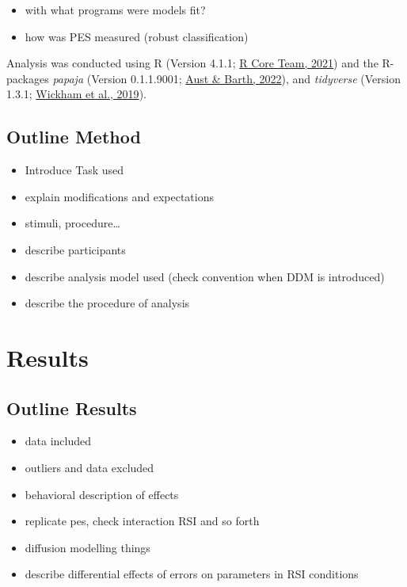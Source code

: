 \documentclass[
  man,floatsintext]{apa7}
\providecommand{\tightlist}{%
  \setlength{\itemsep}{0pt}\setlength{\parskip}{0pt}}
\begin{document}
\begin{itemize}
\tightlist
\item
  with what programs were models fit?
\item
  how was PES measured (robust classification)
\end{itemize}

Analysis was conducted using R (Version 4.1.1; \protect\hyperlink{ref-R-base}{R Core Team, 2021}) and the R-packages \emph{papaja} (Version 0.1.1.9001; \protect\hyperlink{ref-R-papaja}{Aust \& Barth, 2022}), and \emph{tidyverse} (Version 1.3.1; \protect\hyperlink{ref-R-tidyverse}{Wickham et al., 2019}).

\hypertarget{outline-method}{%
\subsection{Outline Method}\label{outline-method}}

\begin{itemize}
\tightlist
\item
  Introduce Task used
\item
  explain modifications and expectations
\item
  stimuli, procedure\ldots{}
\item
  describe participants
\item
  describe analysis model used (check convention when DDM is introduced)
\item
  describe the procedure of analysis
\end{itemize}

\hypertarget{results}{%
\section{Results}\label{results}}

\hypertarget{outline-results}{%
\subsection{Outline Results}\label{outline-results}}

\begin{itemize}
\tightlist
\item
  data included
\item
  outliers and data excluded
\item
  behavioral description of effects
\item
  replicate pes, check interaction RSI and so forth
\item
  diffusion modelling things
\item
  describe differential effects of errors on parameters in RSI conditions
\end{itemize}
\end{document}
